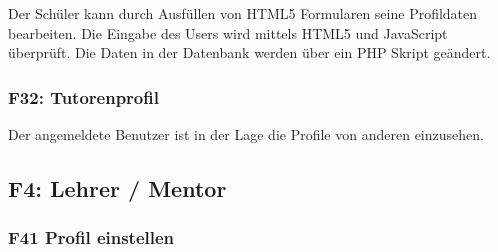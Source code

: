 \documentclass[10pt,a4paper]{scrartcl}
\begin{document}
Der Schüler kann durch Ausfüllen von HTML5 Formularen seine Profildaten bearbeiten. Die Eingabe des Users wird mittels HTML5 und JavaScript überprüft. Die Daten in der Datenbank werden über ein PHP Skript geändert.


\subsubsection*{F32: Tutorenprofil}


Der angemeldete Benutzer ist in der Lage die Profile von anderen einzusehen.

%

\subsection{F4: Lehrer / Mentor}
\subsubsection*{F41 Profil einstellen}
\end{document}
